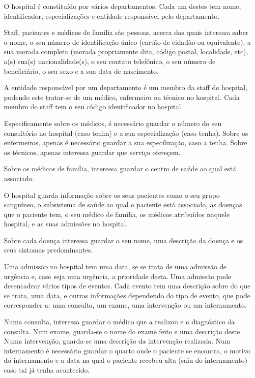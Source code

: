 \documentclass[article, a4paper, 12pt, oneside]{memoir}
\begin{document}
O hospital é constituído por vários departamentos. Cada um destes tem nome, identificador, especializações e entidade responsável pelo departamento.

Staff, pacientes e médicos de família são pessoas, acerca das quais interessa saber o nome, o seu número de identificação único (cartão de cidadão ou equivalente), a sua morada completa (morada propriamente dita, código postal, localidade, etc), a(s) sua(s) nacionalidade(s), o seu contato telefónico, o seu número de beneficiário, o seu sexo e a sua data de nascimento.

A entidade responsável por um departamento é um membro da staff do hospital, podendo este tratar-se de um médico, enfermeiro ou técnico no hospital. Cada membro do staff tem o seu código identificador no hospital.

Especificamente sobre os médicos, é necessário guardar o número do seu consultório no hospital (caso tenha) e a sua especialização (caso tenha).
Sobre os enfermeiros, apenas é necessário guardar a sua especilização, caso a tenha.
Sobre os técnicos, apenas interessa guardar que serviço ofereçem.

Sobre os médicos de família, interessa guardar o centro de saúde ao qual está associado.

O hospital guarda informação sobre os seus pacientes como o seu grupo sanguíneo, o subsistema de saúde ao qual o paciente está associado, as doenças que o paciente tem, o seu médico de família, os médicos atribuídos naquele hospital, e as suas admissões no hospital.

Sobre cada doença interessa guardar o seu nome, uma descrição da doença e os seus sintomas predominantes.

Uma admissão no hospital tem uma data, se se trata de uma admissão de urgência e, caso seja uma urgência, a prioridade desta. Uma admissão pode desencadear vários tipos de eventos. Cada evento tem uma descrição sobre do que se trata, uma data, e outras informações dependendo do tipo de evento, que pode corresponder a: uma consulta, um exame, uma intervenção ou um internamento.

Numa consulta, interessa guardar o médico que a realizou e o diagnóstico da consulta.
Num exame, guarda-se o nome do exame feito e uma descrição deste.
Numa intervenção, guarda-se uma descrição da intervenção realizada.
Num internamento é necessário guardar o quarto onde o paciente se encontra, o motivo do internamento e a data na qual o paciente recebeu alta (saiu do internamento) caso tal já tenha acontecido.
\end{document}
